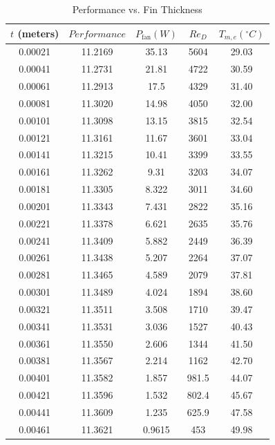 \documentclass[12pt, titlepage]{article}
\begin{document}
\begin{table}[H]
\centering
\caption{Performance vs. Fin Thickness}
\begin{tabular}{|c|c|c|c|c|}
\hline
$t$ (meters) & $Performance$ & $P_{\mathrm{fan}} (W)$ & $Re_D$ & $T_{m,e} (^\circ C)$ \\
\hline
0.00021 & 11.2169 & 35.13 & 5604 & 29.03 \\\hline
0.00041 & 11.2731 & 21.81 & 4722 & 30.59 \\\hline
0.00061 & 11.2913 & 17.5 & 4329 & 31.40 \\\hline
0.00081 & 11.3020 & 14.98 & 4050 & 32.00 \\\hline
0.00101 & 11.3098 & 13.15 & 3815 & 32.54 \\\hline
0.00121 & 11.3161 & 11.67 & 3601 & 33.04 \\\hline
0.00141 & 11.3215 & 10.41 & 3399 & 33.55 \\\hline
0.00161 & 11.3262 & 9.31 & 3203 & 34.07 \\\hline
0.00181 & 11.3305 & 8.322 & 3011 & 34.60 \\\hline
0.00201 & 11.3343 & 7.431 & 2822 & 35.16 \\\hline
0.00221 & 11.3378 & 6.621 & 2635 & 35.76 \\\hline
0.00241 & 11.3409 & 5.882 & 2449 & 36.39 \\\hline
0.00261 & 11.3438 & 5.207 & 2264 & 37.07 \\\hline
0.00281 & 11.3465 & 4.589 & 2079 & 37.81 \\\hline
0.00301 & 11.3489 & 4.024 & 1894 & 38.60 \\\hline
0.00321 & 11.3511 & 3.508 & 1710 & 39.47 \\\hline
0.00341 & 11.3531 & 3.036 & 1527 & 40.43 \\\hline
0.00361 & 11.3550 & 2.606 & 1344 & 41.50 \\\hline
0.00381 & 11.3567 & 2.214 & 1162 & 42.70 \\\hline
0.00401 & 11.3582 & 1.857 & 981.5 & 44.07 \\\hline
0.00421 & 11.3596 & 1.532 & 802.4 & 45.67 \\\hline
0.00441 & 11.3609 & 1.235 & 625.9 & 47.58 \\\hline
0.00461 & 11.3621 & 0.9615 & 453 & 49.98 \\\hline
\end{tabular}
\end{table}
\end{document}
